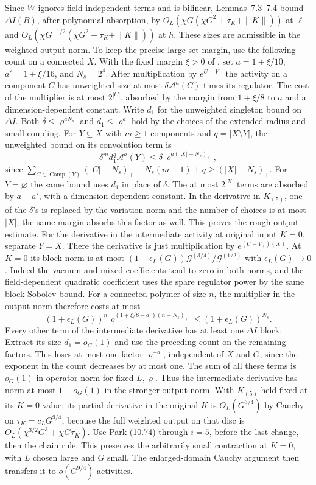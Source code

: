 \documentclass[11pt]{article}
\begin{document}
Since \(W\) ignores field-independent terms and is
bilinear, Lemmas~7.3--7.4 bound \(\Delta I(B)\), after
polynomial absorption, by
\(O_L(\chi G(\chi G^2+\tau_K+\|K\|))\) at \(\ell\)
and \(O_L(\chi G^{-1/2}(\chi G^2+\tau_K+\|K\|))\)
at \(h\). These sizes are admissible in the weighted output
norm. To keep the precise large-set margin, use the
following count on a connected \(X\). With the fixed margin \(\xi>0\) of \cite[Section 9]{ParkMap}, set
\(a=1+\xi/10\), \(a'=1+\xi/16\), and \(N_s=2^4\).
After multiplication by \(e^{U-V_+}\) the activity
on a component \(C\) has unweighted size at most
\(\delta \mathcal A^a(C)\) times its regulator. The cost of the
multiplier is at most \(2^{|C|}\), absorbed by the
margin from \(1+\xi/8\) to \(a\) and a dimension-dependent
constant. Write \(d_1\) for the unweighted singleton
bound on \(\Delta I\). Both \(\delta\le\varrho^{aN_s}\) and
\(d_1\le\varrho^a\) hold by the choices of the extended
radius and small coupling. For \(Y\subseteq X\) with
\(m\ge1\) components and \(q=|X\setminus Y|\), the
unweighted bound on its convolution term is
\[
 \delta^m d_1^q \mathcal A^a(Y)
 \le \delta\,\varrho^{a(|X|-N_s)_+},
\]
since \(\sum_{C\in\operatorname{Comp}(Y)}(|C|-N_s)_+
  +N_s(m-1)+q\ge (|X|-N_s)_+\).
For \(Y=\varnothing\) the same bound uses \(d_1\) in
place of \(\delta\). The at most \(2^{|X|}\) terms are
absorbed by \(a-a'\), with a dimension-dependent
constant. In the derivative in \(K_{(5)}\), one of the
\(\delta\)'s is replaced by the variation norm and the
number of choices is at most \(|X|\); the same margin
absorbs this factor as well. This proves the rough
output estimate. For the derivative in the intermediate
activity at original input \(K=0\), separate \(Y=X\).
There the derivative is just multiplication by
\(e^{(U-V_+)(X)}\). At \(K=0\) its block norm is at most
\((1+\epsilon_L(G))\mathcal G^{(3/4)}/\mathcal G^{(1/2)}\)
with \(\epsilon_L(G)\to0\). Indeed the vacuum and mixed
coefficients tend to zero in both norms, and the
field-dependent quadratic coefficient uses the spare
regulator power by the same block Sobolev bound. For a
connected polymer of size \(n\), the multiplier in the
output norm therefore costs at most
\[
 (1+\epsilon_L(G))^n
    \varrho^{(1+\xi/8-a')(n-N_s)_+}
 \le (1+\epsilon_L(G))^{N_s}.
\]
Every other term of the intermediate derivative has
at least one \(\Delta I\) block. Extract its size \(d_1=o_G(1)\)
and use the preceding count on the remaining factors.
This loses at most one factor \(\varrho^{-a}\),
independent of \(X\) and \(G\), since the exponent in
the count decreases by at most one. The sum of all
these terms is \(o_G(1)\) in operator norm for fixed
\(L,\varrho\). Thus the intermediate derivative has
norm at most \(1+o_G(1)\) in the stronger output norm.
With \(K_{(5)}\) held
fixed at its \(K=0\) value, its partial derivative in the
original \(K\) is \(O_L(G^{3/4})\) by Cauchy on
\(\tau_K=c_LG^{9/4}\), because the full weighted output
on that disc is
\(O_L(\chi^{3/2}G^3+\chi G\tau_K)\).
Use Park (10.74) through \(i=5\), before the last change,
then the chain rule. This preserves the arbitrarily
small contraction at \(K=0\), with \(L\) chosen large
and \(G\) small. The enlarged-domain Cauchy argument
then transfers it to \(o(G^{9/4})\) activities.
\end{document}
